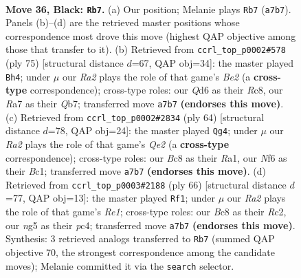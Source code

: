 \documentclass[11pt]{article}
\begin{document}
\clearpage

\begin{figure}[p]\centering
\begin{subfigure}{0.46\textwidth}\centering
\resizebox{\linewidth}{!}{%
\newchessgame
\chessboard[
  setfen={2b2k2/r4p2/3q1np1/1B4Np/P7/6P1/1p1NRP1P/4R1K1 b - - 1 36},
  showmover=false,
  pgfstyle=straightmove, color=movearrow, markmove={a7-b7}
]}
\caption{}
\end{subfigure}\hfill
\begin{subfigure}{0.46\textwidth}\centering
\resizebox{\linewidth}{!}{%
\newchessgame
\chessboard[
  setfen={2r3k1/1q2bp2/p5p1/4Bn1p/1P6/P1N4P/1P2R1PK/4Q3 b - - 2 38},
  showmover=false,
  pgfstyle=straightmove, color=movearrow, markmove={e7-h4}
]}
\caption{}
\end{subfigure}
\\[4pt]
\begin{subfigure}{0.46\textwidth}\centering
\resizebox{\linewidth}{!}{%
\newchessgame
\chessboard[
  setfen={3r2k1/4pp2/3rn1p1/p2n4/7b/PB5P/1P2QP2/R1B3K1 w - - 0 33},
  showmover=false,
  pgfstyle=straightmove, color=movearrow, markmove={e2-g4}
]}
\caption{}
\end{subfigure}\hfill
\begin{subfigure}{0.46\textwidth}\centering
\resizebox{\linewidth}{!}{%
\newchessgame
\chessboard[
  setfen={5rk1/p5p1/4p3/1p3rBp/2pbN2P/5PK1/P1R5/4R3 w - - 4 34},
  showmover=false,
  pgfstyle=straightmove, color=movearrow, markmove={e1-f1}
]}
\caption{}
\end{subfigure}
\caption{\textbf{Move 36, Black: \texttt{Rb7}.} (a) Our position; Melanie plays \texttt{Rb7} (\texttt{a7b7}). Panels (b)--(d) are the retrieved master positions whose correspondence most drove this move (highest QAP objective among those that transfer to it). (b) Retrieved from \texttt{ccrl\_top\_p0002\#578} (ply 75) [structural distance $d$=67, QAP obj=34]: the master played \texttt{Bh4}; under $\mu$ our \emph{Ra2} plays the role of that game's \emph{Be2} (a \textbf{cross-type} correspondence); cross-type roles: our \emph{Q}d6 as their \emph{R}c8, our \emph{R}a7 as their \emph{Q}b7; transferred move \texttt{a7b7} \textbf{(endorses this move)}. (c) Retrieved from \texttt{ccrl\_top\_p0002\#2834} (ply 64) [structural distance $d$=78, QAP obj=24]: the master played \texttt{Qg4}; under $\mu$ our \emph{Ra2} plays the role of that game's \emph{Qe2} (a \textbf{cross-type} correspondence); cross-type roles: our \emph{B}c8 as their \emph{R}a1, our \emph{N}f6 as their \emph{B}c1; transferred move \texttt{a7b7} \textbf{(endorses this move)}. (d) Retrieved from \texttt{ccrl\_top\_p0003\#2188} (ply 66) [structural distance $d$=77, QAP obj=13]: the master played \texttt{Rf1}; under $\mu$ our \emph{Ra2} plays the role of that game's \emph{Re1}; cross-type roles: our \emph{B}c8 as their \emph{R}c2, our \emph{n}g5 as their \emph{p}c4; transferred move \texttt{a7b7} \textbf{(endorses this move)}. Synthesis: 3 retrieved analogs transferred to \texttt{Rb7} (summed QAP objective 70, the strongest correspondence among the candidate moves); Melanie committed it via the \texttt{search} selector.}
\label{fig:thought-m71}
\end{figure}
\end{document}
